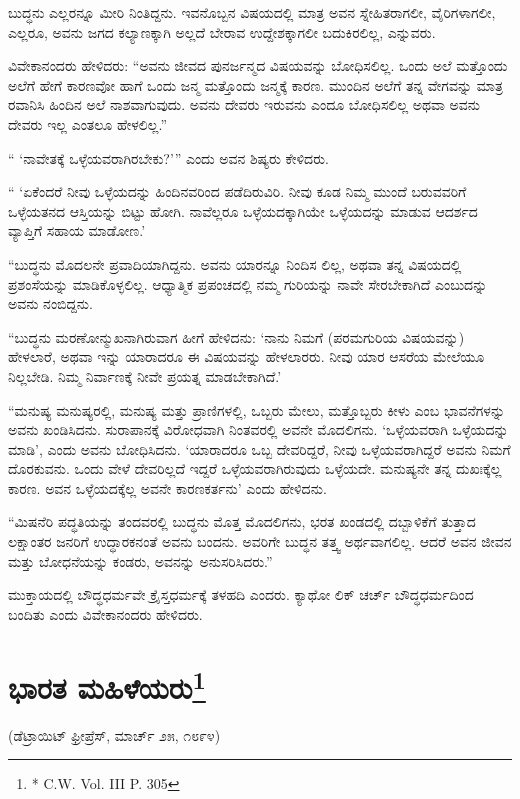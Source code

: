 ಬುದ್ಧನು ಎಲ್ಲರನ್ನೂ ಮೀರಿ ನಿಂತಿದ್ದನು. ಇವನೊಬ್ಬನ ವಿಷಯದಲ್ಲಿ ಮಾತ್ರ ಅವನ ಸ್ನೇಹಿತರಾಗಲೀ, ವೈರಿಗಳಾಗಲೀ, ಎಲ್ಲರೂ, ಅವನು ಜಗದ ಕಲ್ಯಾಣಕ್ಕಾಗಿ ಅಲ್ಲದೆ ಬೇರಾವ ಉದ್ದೇಶಕ್ಕಾಗಲೀ ಬದುಕಿರಲಿಲ್ಲ, ಎನ್ನುವರು.

ವಿವೇಕಾನಂದರು ಹೇಳಿದರು: “ಅವನು ಜೀವದ ಪುನರ್ಜನ್ಮದ ವಿಷಯವನ್ನು ಬೋಧಿಸಲಿಲ್ಲ. ಒಂದು ಅಲೆ ಮತ್ತೊಂದು ಅಲೆಗೆ ಹೇಗೆ ಕಾರಣವೋ ಹಾಗೆ ಒಂದು ಜನ್ಮ ಮತ್ತೊಂದು ಜನ್ಮಕ್ಕೆ ಕಾರಣ. ಮುಂದಿನ ಅಲೆಗೆ ತನ್ನ ವೇಗವನ್ನು ಮಾತ್ರ ರವಾನಿಸಿ ಹಿಂದಿನ ಅಲೆ ನಾಶವಾಗುವುದು. ಅವನು ದೇವರು ಇರುವನು ಎಂದೂ ಬೋಧಿಸಲಿಲ್ಲ ಅಥವಾ ಅವನು ದೇವರು ಇಲ್ಲ ಎಂತಲೂ ಹೇಳಲಿಲ್ಲ.”

“ ‘ನಾವೇತಕ್ಕೆ ಒಳ್ಳೆಯವರಾಗಿರಬೇಕು?’” ಎಂದು ಅವನ ಶಿಷ್ಯರು ಕೇಳಿದರು.

“ ‘ಏಕೆಂದರೆ ನೀವು ಒಳ್ಳೆಯದನ್ನು ಹಿಂದಿನವರಿಂದ ಪಡೆದಿರುವಿರಿ. ನೀವು ಕೂಡ ನಿಮ್ಮ ಮುಂದೆ ಬರುವವರಿಗೆ ಒಳ್ಳೆಯತನದ ಆಸ್ತಿಯನ್ನು ಬಿಟ್ಟು ಹೋಗಿ. ನಾವೆಲ್ಲರೂ ಒಳ್ಳೆಯದಕ್ಕಾಗಿಯೇ ಒಳ್ಳೆಯದನ್ನು ಮಾಡುವ ಆದರ್ಶದ ವ್ಯಾಪ್ತಿಗೆ ಸಹಾಯ ಮಾಡೋಣ.’

“ಬುದ್ಧನು ಮೊದಲನೇ ಪ್ರವಾದಿಯಾಗಿದ್ದನು. ಅವನು ಯಾರನ್ನೂ ನಿಂದಿಸ ಲಿಲ್ಲ, ಅಥವಾ ತನ್ನ ವಿಷಯದಲ್ಲಿ ಪ್ರಶಂಸೆಯನ್ನು ಮಾಡಿಕೊಳ್ಳಲಿಲ್ಲ. ಆಧ್ಯಾತ್ಮಿಕ ಪ್ರಪಂಚದಲ್ಲಿ ನಮ್ಮ ಗುರಿಯನ್ನು ನಾವೇ ಸೇರಬೇಕಾಗಿದೆ ಎಂಬುದನ್ನು ಅವನು ನಂಬಿದ್ದನು.

“ಬುದ್ಧನು ಮರಣೋನ್ಮುಖನಾಗಿರುವಾಗ ಹೀಗೆ ಹೇಳಿದನು: ‘ನಾನು ನಿಮಗೆ (ಪರಮಗುರಿಯ ವಿಷಯವನ್ನು) ಹೇಳಲಾರೆ, ಅಥವಾ ಇನ್ನು ಯಾರಾದರೂ ಈ ವಿಷಯವನ್ನು ಹೇಳಲಾರರು. ನೀವು ಯಾರ ಆಸರೆಯ ಮೇಲೆಯೂ ನಿಲ್ಲಬೇಡಿ. ನಿಮ್ಮ ನಿರ್ವಾಣಕ್ಕೆ ನೀವೇ ಪ್ರಯತ್ನ ಮಾಡಬೇಕಾಗಿದೆ.’

“ಮನುಷ್ಯ ಮನುಷ್ಯರಲ್ಲಿ, ಮನುಷ್ಯ ಮತ್ತು ಪ್ರಾಣಿಗಳಲ್ಲಿ, ಒಬ್ಬರು ಮೇಲು, ಮತ್ತೊಬ್ಬರು ಕೀಳು ಎಂಬ ಭಾವನೆಗಳನ್ನು ಅವನು ಖಂಡಿಸಿದನು. ಸುರಾಪಾನಕ್ಕೆ ವಿರೋಧವಾಗಿ ನಿಂತವರಲ್ಲಿ ಅವನೇ ಮೊದಲಿಗನು. ‘ಒಳ್ಳೆಯವರಾಗಿ ಒಳ್ಳೆಯದನ್ನು ಮಾಡಿ’, ಎಂದು ಅವನು ಬೋಧಿಸಿದನು. ‘ಯಾರಾದರೂ ಒಬ್ಬ ದೇವರಿದ್ದರೆ, ನೀವು ಒಳ್ಳೆಯವರಾಗಿದ್ದರೆ ಅವನು ನಿಮಗೆ ದೊರಕುವನು. ಒಂದು ವೇಳೆ ದೇವರಿಲ್ಲದೆ ಇದ್ದರೆ ಒಳ್ಳೆಯವರಾಗಿರುವುದು ಒಳ್ಳೆಯದೇ. ಮನುಷ್ಯನೇ ತನ್ನ ದುಖಃಕ್ಕೆಲ್ಲ ಕಾರಣ. ಅವನ ಒಳ್ಳೆಯದಕ್ಕೆಲ್ಲ ಅವನೇ ಕಾರಣಕರ್ತನು’ ಎಂದು ಹೇಳಿದನು.

“ಮಿಷನೆರಿ ಪದ್ಧತಿಯನ್ನು ತಂದವರಲ್ಲಿ ಬುದ್ಧನು ಮೊತ್ತ ಮೊದಲಿಗನು, ಭರತ ಖಂಡದಲ್ಲಿ ದಬ್ಬಾಳಿಕೆಗೆ ತುತ್ತಾದ ಲಕ್ಷಾಂತರ ಜನರಿಗೆ ಉದ್ಧಾರಕನಂತೆ ಅವನು ಬಂದನು. ಅವರಿಗೇ ಬುದ್ಧನ ತತ್ತ್ವ ಅರ್ಥವಾಗಲಿಲ್ಲ. ಆದರೆ ಅವನ ಜೀವನ ಮತ್ತು ಬೋಧನೆಯನ್ನು ಕಂಡರು, ಅವನನ್ನು ಅನುಸರಿಸಿದರು.”

ಮುಕ್ತಾಯದಲ್ಲಿ ಬೌದ್ಧಧರ್ಮವೇ ಕ್ರೈಸ್ತಧರ್ಮಕ್ಕೆ ತಳಹದಿ ಎಂದರು. ಕ್ಯಾಥೋ ಲಿಕ್​ ಚರ್ಚ್​ ಬೌದ್ಧಧರ್ಮದಿಂದ ಬಂದಿತು ಎಂದು ವಿವೇಕಾನಂದರು ಹೇಳಿದರು.

\delimiter


\section{ಭಾರತ ಮಹಿಳೆಯರು\protect\footnote{* C.W. Vol. III P. 305}}

\begin{center}
(ಡೆಟ್ರಾಯಿಟ್​ ಫ್ರೀಪ್ರೆಸ್​, ಮಾರ್ಚ್​ ೨೫, ೧೮೯೪)
\end{center}


